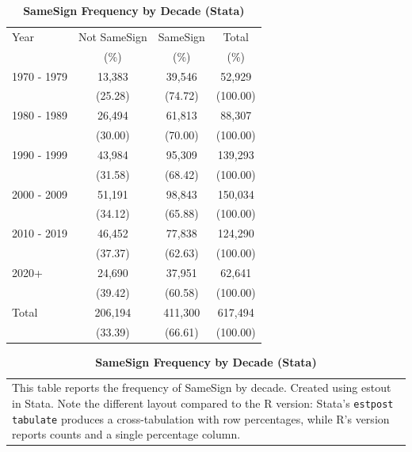 \documentclass[english,authoryear,IEEEtran,12pt]{article}
\begin{document}
\begin{table}[htbp]\centering\footnotesize{
\renewcommand{\arraystretch}{1.5}
\caption{\textbf{SameSign Frequency by Decade (Stata)} \label{tab:freq-stata}}
\def\sym#1{\ifmmode^{#1}\else\(^{#1}\)\fi}

\begin{tabularx}{\textwidth}{Xccc}
\toprule
Year & Not SameSign & SameSign & Total\\
     & (\%) & (\%) & (\%) \\
\midrule
1970 - 1979&   13,383&   39,546&   52,929\\
          &  (25.28)&  (74.72)& (100.00)\\
1980 - 1989&   26,494&   61,813&   88,307\\
          &  (30.00)&  (70.00)& (100.00)\\
1990 - 1999&   43,984&   95,309&  139,293\\
          &  (31.58)&  (68.42)& (100.00)\\
2000 - 2009&   51,191&   98,843&  150,034\\
          &  (34.12)&  (65.88)& (100.00)\\
2010 - 2019&   46,452&   77,838&  124,290\\
          &  (37.37)&  (62.63)& (100.00)\\
2020+     &   24,690&   37,951&   62,641\\
          &  (39.42)&  (60.58)& (100.00)\\
Total     &  206,194&  411,300&  617,494\\
          &  (33.39)&  (66.61)& (100.00)\\
\bottomrule
\end{tabularx}

\vspace{-1.5\baselineskip}
\singlespace
\flushleft
\begin{tabular}{@{}p{\linewidth}@{}}
\footnotesize
This table reports the frequency of SameSign by decade. Created using estout in Stata. Note the different layout compared to the R version: Stata's \texttt{estpost tabulate} produces a cross-tabulation with row percentages, while R's version reports counts and a single percentage column.
\end{tabular}
}
\end{table}


\clearpage\newpage

\end{document}
